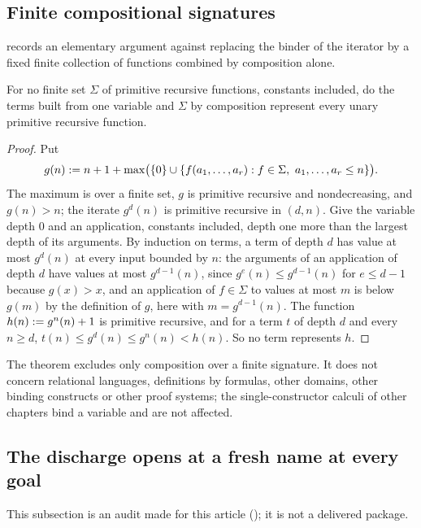 \subsection{Finite compositional signatures}\label{cert:sec:finite-signature}

 records an elementary argument against replacing
the binder of the iterator by a fixed finite collection of functions combined
by composition alone.

\begin{theorem}\label{cert:thm:finite-signature}
For no finite set $\Sigma$ of primitive recursive functions, constants
included, do the terms built from one variable and $\Sigma$ by composition
represent every unary primitive recursive function.
\end{theorem}
\begin{proof}
Put
\[
g(n)\mathrel{:=} n+1+\max\bigl(\{0\}\cup\{f(a_1,\dots,a_r):f\in\Sigma,\ a_1,\dots,
a_r\le n\}\bigr).
\]
The maximum is over a finite set, $g$ is primitive recursive and
nondecreasing, and $g(n)>n$; the iterate $g^d(n)$ is primitive recursive in
$(d,n)$. Give the variable depth $0$ and an application, constants included,
depth one more than the largest depth of its arguments. By induction on
terms, a term of depth $d$ has value at most $g^d(n)$ at every input bounded
by $n$: the arguments of an application of depth $d$ have values at most
$g^{d-1}(n)$, since $g^{e}(n)\le g^{d-1}(n)$ for $e\le d-1$ because
$g(x)>x$, and an application of $f\in\Sigma$ to values at most $m$ is below
$g(m)$ by the definition of $g$, here with $m=g^{d-1}(n)$. The function $h(n)\mathrel{:=} g^n(n)+1$ is primitive recursive,
and for a term $t$ of depth $d$ and every $n\ge d$,
$t(n)\le g^d(n)\le g^n(n)<h(n)$. So no term represents $h$.
\end{proof}

The theorem excludes only composition over a finite signature. It does not
concern relational languages, definitions by formulas, other domains, other
binding constructs or other proof systems; the single-constructor calculi of
other chapters bind a variable and are not affected.

\subsection{The discharge opens at a fresh name at every goal}\label{cert:sec:discharge-fresh}

This subsection is an audit made for this article (); it
is not a delivered package.

